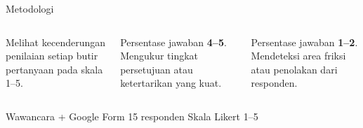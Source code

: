 \documentclass[aspectratio=169]{beamer}
\newcommand{\faCalculator}{[\#]}
\newcommand{\faThumbsUp}{[+]}
\newcommand{\faThumbsDown}{[-]}
\newcommand{\faLink}{[L]}
\begin{document}
\begin{frame}{Metodologi}
  \begin{columns}[T]
      \begin{tcolorbox}[statbox,title={\faCalculator\quad 1. Rata-rata Skor},height=4.5cm]
        \small Melihat kecenderungan penilaian setiap butir pertanyaan pada skala 1--5.
      \end{tcolorbox}
      \begin{tcolorbox}[statbox,title={\faThumbsUp\quad 2. Top-2 Box},height=4.5cm]
        \small Persentase jawaban \textbf{4--5}. Mengukur tingkat persetujuan atau ketertarikan yang kuat.
      \end{tcolorbox}
      \begin{tcolorbox}[statbox,title={\faThumbsDown\quad 3. Bottom-2 Box},height=4.5cm]
        \small Persentase jawaban \textbf{1--2}. Mendeteksi area friksi atau penolakan dari responden.
      \end{tcolorbox}
  \end{columns}
  \vspace{0.4cm}
  \begin{tcolorbox}[insightbox,title={\faLink\quad Sumber Data}]
    \centering\small
    Wawancara + Google Form \textbullet{} 15 responden \textbullet{} Skala Likert 1--5
  \end{tcolorbox}
\end{frame}
\end{document}
